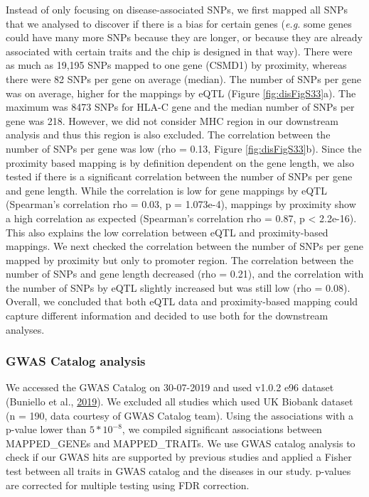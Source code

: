 \documentclass[12pt,twoside]{unicam}
\begin{document}
Instead of only focusing on disease-associated SNPs, we first mapped all SNPs that we analysed to discover if there is a bias for certain genes (\emph{e.g.} some genes could have many more SNPs because they are longer, or because they are already associated with certain traits and the chip is designed in that way). There were as much as 19,195 SNPs mapped to one gene (CSMD1) by proximity, whereas there were 82 SNPs per gene on average (median). The number of SNPs per gene was on average, higher for the mappings by eQTL (Figure \ref{fig:disFigS33}a). The maximum was 8473 SNPs for HLA-C gene and the median number of SNPs per gene was 218. However, we did not consider MHC region in our downstream analysis and thus this region is also excluded. The correlation between the number of SNPs per gene was low (rho = 0.13, Figure \ref{fig:disFigS33}b). Since the proximity based mapping is by definition dependent on the gene length, we also tested if there is a significant correlation between the number of SNPs per gene and gene length. While the correlation is low for gene mappings by eQTL (Spearman's correlation rho = 0.03, p = 1.073e-4), mappings by proximity show a high correlation as expected (Spearman's correlation rho = 0.87, p \textless{} 2.2e-16). This also explains the low correlation between eQTL and proximity-based mappings. We next checked the correlation between the number of SNPs per gene mapped by proximity but only to promoter region. The correlation between the number of SNPs and gene length decreased (rho = 0.21), and the correlation with the number of SNPs by eQTL slightly increased but was still low (rho = 0.08). Overall, we concluded that both eQTL data and proximity-based mapping could capture different information and decided to use both for the downstream analyses.

\hypertarget{gwas-catalog-analysis}{%
\subsubsection{GWAS Catalog analysis}\label{gwas-catalog-analysis}}

We accessed the GWAS Catalog on 30-07-2019 and used v1.0.2 e96 dataset (Buniello et al., \protect\hyperlink{ref-Buniello2019}{2019}). We excluded all studies which used UK Biobank dataset (n = 190, data courtesy of GWAS Catalog team). Using the associations with a p-value lower than \(5*10^{-8}\), we compiled significant associations between MAPPED\_GENEs and MAPPED\_TRAITs. We use GWAS catalog analysis to check if our GWAS hits are supported by previous studies and applied a Fisher test between all traits in GWAS catalog and the diseases in our study. p-values are corrected for multiple testing using FDR correction.
\end{document}
